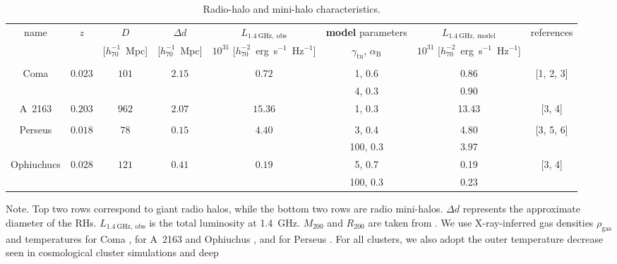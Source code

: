 \documentclass[traditabstract]{aa}
\def\C#1{{\bf #1}}
\newcommand{\rmn}{\mathrm}
\begin{document}
\begin{table}[t]
\begin{center}
\caption{Radio-halo and mini-halo characteristics.}
\medskip
\begin{tabular}{cccccccc}
\hline\hline
\phantom{\Big|}
name & $z$ & $D$ & $\Delta d$ & $L_{1.4~\rmn{GHz},~\rmn{obs}}$ & \C{model} parameters & $L_{1.4~\rmn{GHz},~\rmn{model}}$ & references \\
\phantom{\Big|}
           &   & [$h_{70}^{-1}$~Mpc] & [$h_{70}^{-1}$~Mpc] & $10^{31}$ [$h_{70}^{-2}$~erg~s$^{-1}$~Hz$^{-1}$] & $\gamma_{\rmn{tu}}$, $\alpha_{\rmn{B}}$ & $10^{31}$ [$h_{70}^{-2}$~erg~s$^{-1}$~Hz$^{-1}$] & \\
\hline \\[-0.5em]
Coma           & $0.023$ & $101$ & $2.15$ & $0.72$  & 1, 0.6  & 0.86 &  [1, 2, 3]   \\
               &         &       &        &                        & 4, 0.3  & 0.90  &  \\
A~2163         & $0.203$ & $962$ & $2.07$ & $15.36$     & 1, 0.3  & 13.43  &  [3, 4]  \\
\hline \\[-0.5em]
Perseus        & $0.018$ & $78$   & $0.15$ & $4.40$ & 3, 0.4   & 4.80 &  [3, 5, 6]  \\
               &         &        &        &                       & 100, 0.3 & 3.97 &  \\
Ophiuchucs     & $0.028$ & $121$  & $0.41$ & $0.19$       & 5, 0.7   & 0.19  &  [3, 4] \\
               &         &        &        &                       & 100, 0.3 & 0.23 &   \\[0.5em]
\hline
\end{tabular}
\label{tab:RadioHalos}
\end{center}
\footnotesize{Note. Top two rows correspond to giant radio halos, while the
  bottom two rows are radio mini-halos. $\Delta d$ represents the approximate
  diameter of the RHs. $L_{1.4~\rmn{GHz},~\rmn{obs}}$ is the total luminosity at
  1.4~GHz. $M_{200}$ and $R_{200}$ are taken from \cite{2002ApJ...567..716R}. We
  use X-ray-inferred gas densities $\rho_{\rmn{gas}}$ and temperatures for Coma
  \citep{1992A&A...259L..31B}, for A~2163 and Ophiuchus
  \citep{2002ApJ...567..716R}, and for Perseus \citep{2003ApJ...590..225C}. For
  all clusters, we also adopt the outer temperature decrease seen in
  cosmological cluster simulations \citep[e.g.,][]{2010MNRAS.409..449P} and deep
}
\end{table}
\end{document}
